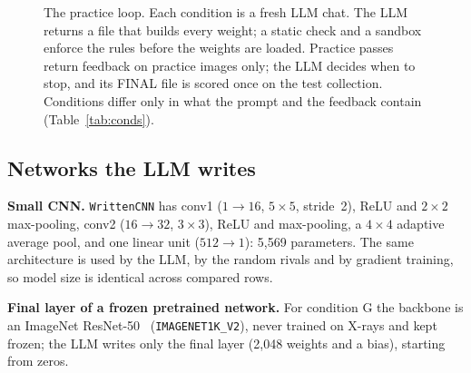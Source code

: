 \documentclass[runningheads]{llncs}
\begin{document}
\begin{figure}[t]
\centering
{}
\caption{The practice loop. Each condition is a fresh LLM chat. The LLM returns a file that builds every weight; a static check and a sandbox enforce the rules before the weights are loaded. Practice passes return feedback on practice images only; the LLM decides when to stop, and its FINAL file is scored once on the test collection. Conditions differ only in what the prompt and the feedback contain (Table~\ref{tab:conds}).}
\label{fig:loop}
\end{figure}

\subsection{Networks the LLM writes}
\noindent\textbf{Small CNN.}
\texttt{WrittenCNN} has conv1 ($1\!\to\!16$, $5\times5$, stride~2), ReLU and $2\times2$ max-pooling, conv2 ($16\!\to\!32$, $3\times3$), ReLU and max-pooling, a $4\times4$ adaptive average pool, and one linear unit ($512\!\to\!1$): 5,569 parameters.
The same architecture is used by the LLM, by the random rivals and by gradient training, so model size is identical across compared rows.

\noindent\textbf{Final layer of a frozen pretrained network.}
For condition G the backbone is an ImageNet ResNet-50~\cite{he2016} (\texttt{IMAGENET1K\_V2}), never trained on X-rays and kept frozen; the LLM writes only the final layer (2,048 weights and a bias), starting from zeros.
\end{document}
